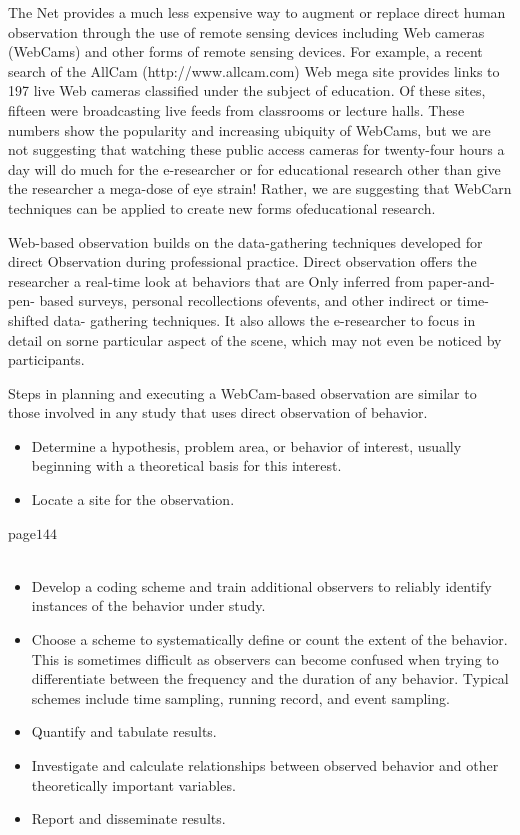 \documentclass{book}
\begin{document}
The Net provides a much less expensive way to augment or replace direct human observation through the use of remote sensing devices including Web cameras (WebCams) and other forms of remote sensing devices. For example, a recent search of the AllCam (http://www.allcam.com) Web mega site provides links to 197 live Web cameras classified under the subject of education. Of these sites, fifteen were broadcasting live feeds from classrooms or lecture halls. These numbers show the popularity and increasing ubiquity of WebCams, but we are not suggesting that watching these public access cameras for twenty-four hours a day will do much for the e-researcher or for educational research other than give the researcher a mega-dose of eye strain! Rather, we are suggesting that WebCarn techniques can be applied to create new forms ofeducational research.\par 
Web-based observation builds on the data-gathering techniques developed for direct Observation during professional practice. Direct observation offers the researcher a real-time look at behaviors that are Only inferred from paper-and-pen- based surveys, personal recollections ofevents, and other indirect or time-shifted data- gathering techniques. It also allows the e-researcher to focus in detail on sorne particular aspect of the scene, which may not even be noticed by participants.\par 
Steps in planning and executing a WebCam-based observation are similar to those involved in any study that uses direct observation of behavior.\\ 
\begin{itemize}
\item Determine a hypothesis, problem area, or behavior of interest, usually beginning with a theoretical basis for this interest.
\item Locate a site for the observation.
\end{itemize}
\newpage
page$144$\\\\\par
\begin{itemize}
\item Develop a coding scheme and train additional observers to reliably identify instances of the behavior under study.
\item Choose a scheme to systematically define or count the extent of the behavior. This is sometimes difficult as observers can become confused when trying to differentiate between the frequency and the duration of any behavior. Typical schemes include time sampling, running record, and event sampling.
\item Quantify and tabulate results. 
\item Investigate and calculate relationships between observed behavior and other theoretically important variables.
\item Report and disseminate results.
\end{itemize}\par
\end{document}
